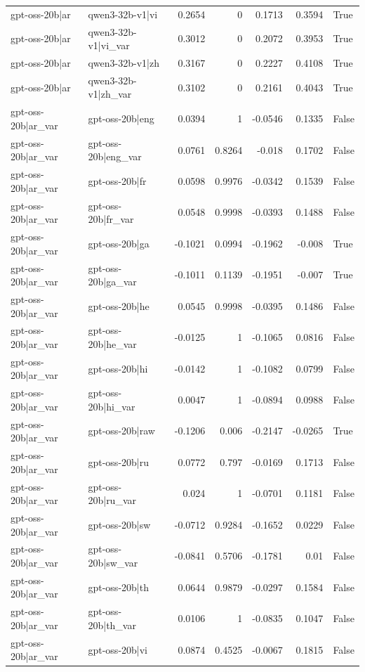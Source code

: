 \begin{table}
\begin{tabular}{l l r r r r l}
gpt-oss-20b|ar & qwen3-32b-v1|vi & 0.2654 & 0 & 0.1713 & 0.3594 & True \\
gpt-oss-20b|ar & qwen3-32b-v1|vi_var & 0.3012 & 0 & 0.2072 & 0.3953 & True \\
gpt-oss-20b|ar & qwen3-32b-v1|zh & 0.3167 & 0 & 0.2227 & 0.4108 & True \\
gpt-oss-20b|ar & qwen3-32b-v1|zh_var & 0.3102 & 0 & 0.2161 & 0.4043 & True \\
gpt-oss-20b|ar_var & gpt-oss-20b|eng & 0.0394 & 1 & -0.0546 & 0.1335 & False \\
gpt-oss-20b|ar_var & gpt-oss-20b|eng_var & 0.0761 & 0.8264 & -0.018 & 0.1702 & False \\
gpt-oss-20b|ar_var & gpt-oss-20b|fr & 0.0598 & 0.9976 & -0.0342 & 0.1539 & False \\
gpt-oss-20b|ar_var & gpt-oss-20b|fr_var & 0.0548 & 0.9998 & -0.0393 & 0.1488 & False \\
gpt-oss-20b|ar_var & gpt-oss-20b|ga & -0.1021 & 0.0994 & -0.1962 & -0.008 & True \\
gpt-oss-20b|ar_var & gpt-oss-20b|ga_var & -0.1011 & 0.1139 & -0.1951 & -0.007 & True \\
gpt-oss-20b|ar_var & gpt-oss-20b|he & 0.0545 & 0.9998 & -0.0395 & 0.1486 & False \\
gpt-oss-20b|ar_var & gpt-oss-20b|he_var & -0.0125 & 1 & -0.1065 & 0.0816 & False \\
gpt-oss-20b|ar_var & gpt-oss-20b|hi & -0.0142 & 1 & -0.1082 & 0.0799 & False \\
gpt-oss-20b|ar_var & gpt-oss-20b|hi_var & 0.0047 & 1 & -0.0894 & 0.0988 & False \\
gpt-oss-20b|ar_var & gpt-oss-20b|raw & -0.1206 & 0.006 & -0.2147 & -0.0265 & True \\
gpt-oss-20b|ar_var & gpt-oss-20b|ru & 0.0772 & 0.797 & -0.0169 & 0.1713 & False \\
gpt-oss-20b|ar_var & gpt-oss-20b|ru_var & 0.024 & 1 & -0.0701 & 0.1181 & False \\
gpt-oss-20b|ar_var & gpt-oss-20b|sw & -0.0712 & 0.9284 & -0.1652 & 0.0229 & False \\
gpt-oss-20b|ar_var & gpt-oss-20b|sw_var & -0.0841 & 0.5706 & -0.1781 & 0.01 & False \\
gpt-oss-20b|ar_var & gpt-oss-20b|th & 0.0644 & 0.9879 & -0.0297 & 0.1584 & False \\
gpt-oss-20b|ar_var & gpt-oss-20b|th_var & 0.0106 & 1 & -0.0835 & 0.1047 & False \\
gpt-oss-20b|ar_var & gpt-oss-20b|vi & 0.0874 & 0.4525 & -0.0067 & 0.1815 & False \\

\end{tabular}
\end{table}

